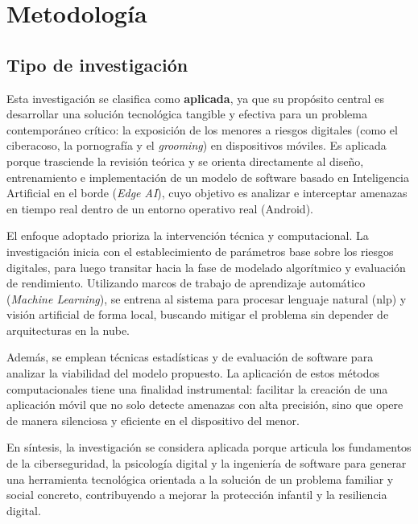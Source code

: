 \chapter[Metodología]{Metodología}
\label{ch:metodologia}

\insertminitoc
\parindent0pt

\section{Tipo de investigación}

Esta investigación se clasifica como \textbf{aplicada}, ya que su propósito central es desarrollar una solución tecnológica tangible y efectiva para un problema contemporáneo crítico: la exposición de los menores a riesgos digitales (como el ciberacoso, la pornografía y el \textit{grooming}) en dispositivos móviles. Es aplicada porque trasciende la revisión teórica y se orienta directamente al diseño, entrenamiento e implementación de un modelo de software basado en Inteligencia Artificial en el borde (\textit{Edge AI}), cuyo objetivo es analizar e interceptar amenazas en tiempo real dentro de un entorno operativo real (Android).

El enfoque adoptado prioriza la intervención técnica y computacional. La investigación inicia con el establecimiento de parámetros base sobre los riesgos digitales, para luego transitar hacia la fase de modelado algorítmico y evaluación de rendimiento. Utilizando marcos de trabajo de aprendizaje automático (\textit{Machine Learning}), se entrena al sistema para procesar lenguaje natural (\gls{nlp}) y visión artificial de forma local, buscando mitigar el problema sin depender de arquitecturas en la nube.

Además, se emplean técnicas estadísticas y de evaluación de software para analizar la viabilidad del modelo propuesto. La aplicación de estos métodos computacionales tiene una finalidad instrumental: facilitar la creación de una aplicación móvil que no solo detecte amenazas con alta precisión, sino que opere de manera silenciosa y eficiente en el dispositivo del menor. 

En síntesis, la investigación se considera aplicada porque articula los fundamentos de la ciberseguridad, la psicología digital y la ingeniería de software para generar una herramienta tecnológica orientada a la solución de un problema familiar y social concreto, contribuyendo a mejorar la protección infantil y la resiliencia digital.



